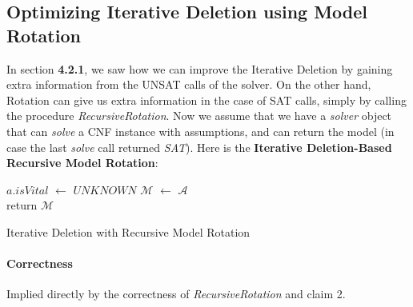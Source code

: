 \documentclass[]{article}
\begin{document}
	\pagebreak
	\subsection{Optimizing Iterative Deletion using Model Rotation}
	In section \textbf{4.2.1}, we saw how we can improve the Iterative Deletion by gaining extra information from the UNSAT calls of the solver. On the other hand, Rotation can give us extra information in the case of SAT calls, simply by calling the procedure \textit{RecursiveRotation}. Now we assume that we have a \textit{solver} object that can \textit{solve} a CNF instance with assumptions, and can return the model (in case the last \textit{solve} call returned \textit{SAT}). Here is the \textbf{Iterative Deletion-Based Recursive Model Rotation}:\\
	
	\begin{algorithm}[H]
		 {
			$ a.isVital $ $\leftarrow$ $ UNKNOWN $
		}
		$ \mathcal{M} $ $\leftarrow$ $ \mathcal{A} $\\
		
		return $ \mathcal{M} $
	\caption{Iterative Deletion with Recursive Model Rotation}
	\end{algorithm}

	\paragraph{Correctness} Implied directly by the correctness of \textit{RecursiveRotation} and claim 2.
	
\end{document}
